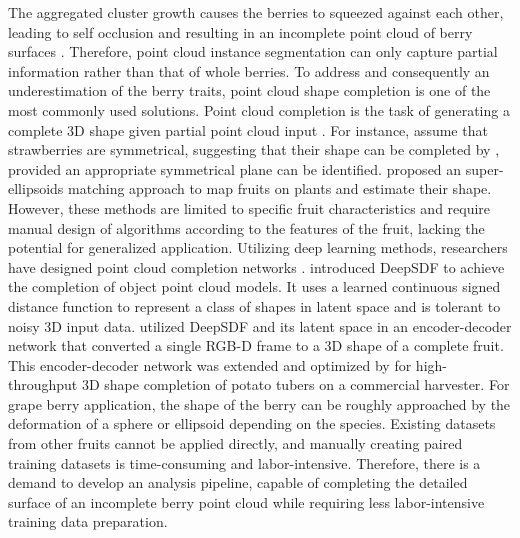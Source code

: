 \documentclass[12pt]{article}
\begin{document}
The aggregated cluster growth causes the berries to squeezed against each other, leading to self occlusion and resulting in an incomplete point cloud of berry surfaces \citep{du_instance_2023}. 
Therefore, point cloud instance segmentation can only capture partial information rather than that of whole berries.
To address  and consequently an underestimation of the berry traits, point cloud shape completion is one of the most commonly used solutions.
Point cloud completion is the task of generating a complete 3D shape given partial point cloud input \citep{tesema_point_2024}. 
For instance, \citet{ge_symmetrybased_2020} assume that strawberries are symmetrical, suggesting that their shape can be completed by , provided an appropriate symmetrical plane can be identified.
\citet{marangoz_fruit_2022} proposed an super-ellipsoids matching approach to map fruits on plants and estimate their shape.
However, these methods are limited to specific fruit characteristics and require manual design of algorithms according to the features of the fruit, lacking the potential for generalized application.
Utilizing deep learning methods, researchers have designed point cloud completion networks \citep{wang_unsupervised_2021}. 
\citet{park_deepsdf_2019} introduced DeepSDF to achieve the completion of object point cloud models. It uses a learned continuous signed distance function to represent a class of shapes in latent space and is tolerant to noisy 3D input data. 
\citet{magistri_contrastive_2022} utilized DeepSDF and its latent space in an encoder-decoder network that converted a single RGB-D frame to a 3D shape of a complete fruit. 
This encoder-decoder network was extended and optimized by \citet{blok_highthroughput_2025} for high-throughput 3D shape completion of potato tubers on a commercial harvester. 
For grape berry application, the shape of the berry can be roughly approached by the deformation of a sphere or ellipsoid depending on the species. 
Existing datasets from other fruits cannot be applied directly, and manually creating paired training datasets is time-consuming and labor-intensive.
Therefore, there is a demand to develop an analysis pipeline, capable of completing the detailed surface of an incomplete berry point cloud while requiring less labor-intensive training data preparation.
\end{document}
